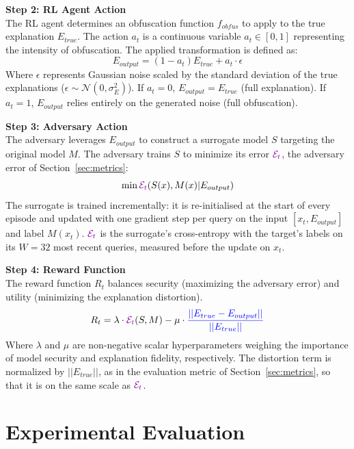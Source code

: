 \documentclass[conference]{IEEEtran}
\DeclareRobustCommand{\rev}[1]{{\color{blue}#1}}
\DeclareRobustCommand{\revnew}[1]{{\color{revpurple}#1}}
\begin{document}
\textbf{Step 2: RL Agent Action}\\
The RL agent determines an obfuscation function $f_{obfus}$ to apply to the true explanation $E_{true}$. The action $a_t$ is a continuous variable $a_t \in [0, 1]$ representing the intensity of obfuscation. The applied transformation is defined as:
\begin{equation}
E_{output} = (1 - a_t)E_{true} + a_t \cdot \epsilon
\end{equation}
Where $\epsilon$ represents Gaussian noise scaled by the standard deviation of the true explanations ($\epsilon \sim \mathcal{N}(0, \sigma_E^2)$). If $a_t = 0$, $E_{output} = E_{true}$ (full explanation). If $a_t = 1$, $E_{output}$ relies entirely on the generated noise (full obfuscation).

\textbf{Step 3: Adversary Action}\\
The adversary leverages $E_{output}$ to construct a surrogate model $S$ targeting the original model $M$. \revnew{The adversary trains $S$ to minimize its error $\revnew{\mathcal{E}_t}$, the adversary error of Section~\ref{sec:metrics}:}
\begin{equation}
\min \revnew{\mathcal{E}_t}(S(x), M(x) | E_{output})
\end{equation}
\rev{The surrogate is trained incrementally: it is re-initialised at the start of every episode and updated with one gradient step per query on the input $[x_t, E_{output}]$ and label $M(x_t)$. $\revnew{\mathcal{E}_t}$ is the surrogate's cross-entropy with the target's labels on its $W=32$ most recent queries, measured before the update on $x_t$.}

\textbf{Step 4: Reward Function}\\
The reward function $R_t$ balances security (maximizing \revnew{the adversary error}) and utility (minimizing \revnew{the explanation distortion}).
\begin{equation}
R_t = \lambda \cdot \revnew{\mathcal{E}_t}(S, M) - \mu \cdot \rev{\frac{||E_{true} - E_{output}||}{||E_{true}||}}
\end{equation}
Where $\lambda$ and $\mu$ are non-negative scalar hyperparameters weighing the importance of model security and explanation fidelity, respectively. \rev{The distortion term is normalized by $||E_{true}||$, as in the evaluation metric of Section~\ref{sec:metrics}, so that it is on the same scale as $\revnew{\mathcal{E}_t}$.}

\section{Experimental Evaluation}
\end{document}
